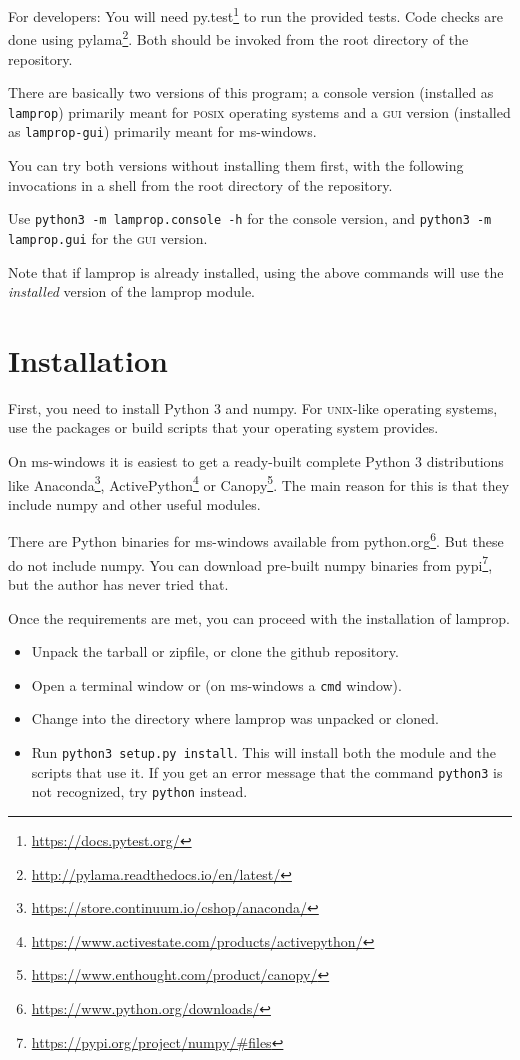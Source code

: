 \documentclass[a4paper,landscape,oneside,11pt,twocolumn]{memoir}
\begin{document}
For developers: You will need py.test\footnote{\url{https://docs.pytest.org/}}
to run the provided tests. Code checks are done using
pylama\footnote{\url{http://pylama.readthedocs.io/en/latest/}}. Both should be
invoked from the root directory of the repository.

There are basically two versions of this program; a console version (installed
as \texttt{lamprop}) primarily meant for \textsc{posix} operating systems and
a \textsc{gui} version (installed as \texttt{lamprop-gui}) primarily meant for
ms-windows.

You can try both versions without installing them first, with the following
invocations in a shell from the root directory of the repository.

Use \texttt{python3 -m lamprop.console -h} for the console version, and
\texttt{python3 -m lamprop.gui} for the \textsc{gui} version.

Note that if lamprop is already installed, using the above commands will use
the \emph{installed} version of the lamprop module.


\section{Installation} %

First, you need to install Python 3 and numpy. For \textsc{unix}-like operating systems,
use the packages or build scripts that your operating system provides.

On ms-windows it is easiest to get a ready-built complete Python 3
distributions like Anaconda\footnote{\url{https://store.continuum.io/cshop/anaconda/}},
ActivePython\footnote{\url{https://www.activestate.com/products/activepython/}} or
Canopy\footnote{\url{https://www.enthought.com/product/canopy/}}. The main
reason for this is that they include numpy and other useful modules.

There are Python binaries for ms-windows available from
python.org\footnote{\url{https://www.python.org/downloads/}}. But these do not
include numpy. You can download pre-built numpy binaries from
pypi\footnote{\url{https://pypi.org/project/numpy/\#files}}, but the author has
never tried that.

Once the requirements are met, you can proceed with the installation of lamprop.

\begin{itemize}
    \item Unpack the tarball or zipfile, or clone the github repository.
    \item Open a terminal window or (on ms-windows a \texttt{cmd} window).
    \item Change into the directory where lamprop was unpacked or cloned.
    \item Run \texttt{python3 setup.py install}. This will install both the module and
        the scripts that use it. If you get an error message that the command
        \texttt{python3} is not recognized, try \texttt{python} instead.
\end{itemize}
\end{document}
